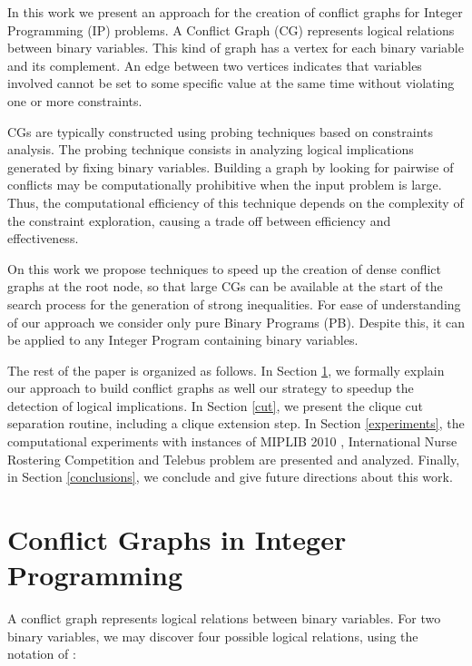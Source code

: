 \documentclass{endm}
\begin{document}
In this work we present an approach for the creation of conflict graphs for Integer Programming (IP) problems. A Conflict Graph (CG) represents logical relations between binary variables. This kind of graph has a vertex for each binary variable and its complement. An edge between two vertices indicates that variables involved cannot be set to some specific value at the same time without violating one or more constraints.

CGs are typically constructed using probing techniques \cite{Borndorfer1998} based on constraints analysis. The probing technique consists in analyzing logical implications generated by fixing binary variables.  Building a graph by looking for pairwise of conflicts may be computationally prohibitive when the input problem is large. Thus, the computational efficiency of this technique depends on the complexity of the constraint exploration, causing a trade off between efficiency and effectiveness. 

On this work we propose techniques to speed up the creation of dense conflict graphs at the root node, so that large CGs can be available at the start of the search process for the generation of strong inequalities. For ease of understanding of our approach we consider only pure Binary Programs (PB). Despite this, it can be applied to any Integer Program containing binary variables. 

The rest of the paper is organized as follows. In Section \ref{seccgraph}, we formally explain our approach to build conflict graphs as well our strategy to speedup the detection of logical implications. In Section \ref{cut}, we present the clique cut separation routine, including a clique extension step. In Section \ref{experiments}, the computational experiments with instances of MIPLIB 2010 \cite{miplib}, International Nurse Rostering Competition \cite{haspeslagh} and Telebus problem \cite{Borndorfer1998} are presented and analyzed. Finally, in Section \ref{conclusions}, we conclude and give future directions about this work.

\section{Conflict Graphs in Integer Programming}\label{seccgraph}

A conflict graph represents logical relations between binary variables. For two binary variables, we may discover four possible logical relations, using the notation of \cite{atamturk}:
\end{document}
